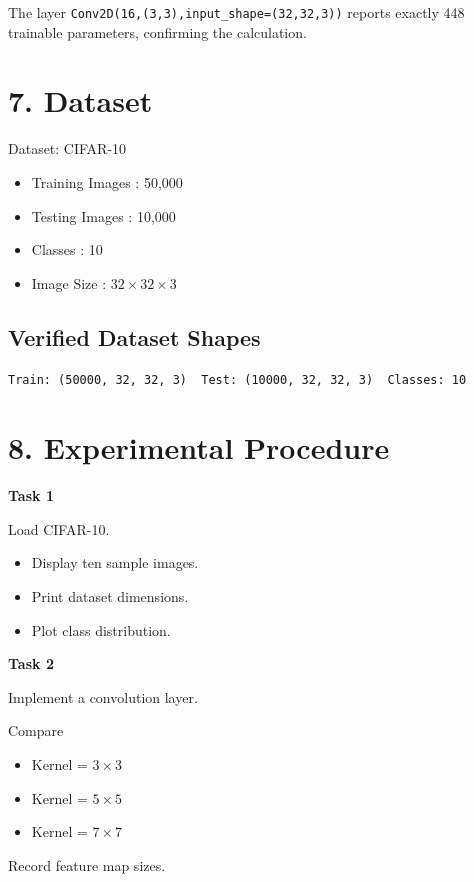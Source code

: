 \documentclass[11pt]{article}
\begin{document}
The layer \texttt{Conv2D(16,(3,3),input\_shape=(32,32,3))} reports exactly 448 trainable parameters, confirming the calculation.

\section*{7. Dataset}

Dataset: CIFAR-10

\begin{itemize}
\item Training Images : 50,000
\item Testing Images : 10,000
\item Classes : 10
\item Image Size : $32\times32\times3$
\end{itemize}

\subsection*{Verified Dataset Shapes}

\begin{verbatim}
Train: (50000, 32, 32, 3)  Test: (10000, 32, 32, 3)  Classes: 10
\end{verbatim}

\section*{8. Experimental Procedure}

\textbf{Task 1}

Load CIFAR-10.

\begin{itemize}
\item Display ten sample images.
\item Print dataset dimensions.
\item Plot class distribution.
\end{itemize}

\textbf{Task 2}

Implement a convolution layer.

Compare

\begin{itemize}
\item Kernel = $3\times3$
\item Kernel = $5\times5$
\item Kernel = $7\times7$
\end{itemize}

Record feature map sizes.
\end{document}
